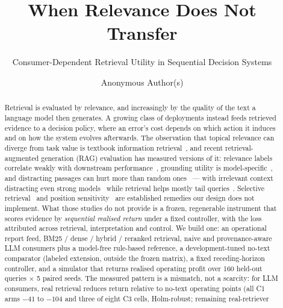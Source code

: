 \documentclass[runningheads]{llncs}
\begin{document}
\title{When Relevance Does Not Transfer}
\subtitle{Consumer-Dependent Retrieval Utility in Sequential Decision Systems}

\author{Anonymous Author(s)}

\maketitle

\begin{abstract}
Retrieval is evaluated by relevance, and increasingly by the quality of the
text a language model then generates. A growing class of deployments instead
feeds retrieved evidence to a decision policy, where an error's cost depends on
which action it induces and on how the system evolves afterwards. The
observation that topical relevance can diverge from task value is textbook
information retrieval~\cite{borlund2003concept}, and recent retrieval-augmented
generation (RAG) evaluation has measured versions of it: relevance labels
correlate weakly with downstream performance~\cite{salemi2024erag}, grounding
utility is model-specific~\cite{grogu2026}, and distracting passages can hurt
more than random ones~\cite{cuconasu2024power,yoran2024making} --- with
irrelevant context distracting even strong models~\cite{shi2023large} while
retrieval helps mostly tail queries~\cite{mallen2023trust}. Selective
retrieval~\cite{jiang2023active,asai2023selfrag} and position
sensitivity~\cite{liu2023lost} are established remedies our design does not
implement. What those
studies do not provide is a frozen, regenerable instrument that scores evidence
by \emph{sequential realised return} under a fixed controller, with the loss
attributed across retrieval, interpretation and control. We build one: an
operational report feed, BM25 / dense / hybrid / reranked retrieval, naive and
provenance-aware LLM consumers plus a model-free rule-based reference, a
development-tuned no-text comparator (labeled extension, outside the frozen
matrix), a fixed receding-horizon controller, and a simulator that returns
realised operating profit over 160 held-out queries $\times$ 5 paired
seeds. The measured pattern is a mismatch, not a scarcity: for LLM consumers, real retrieval
reduces return relative to no-text operating points (all C1 arms $-41$ to
$-104$ and three of eight C3 cells, Holm-robust; remaining real-retriever

\end{abstract}
\end{document}
